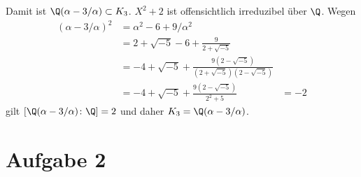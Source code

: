 \documentclass{article}
\begin{document}
\begin{enumerate}
        Damit ist $\Q(\alpha - 3/\alpha) \subset K_3$. $X^2 + 2$ ist offensichtlich irreduzibel über $\Q$.
        Wegen 
        \begin{align*}
            (\alpha - 3/\alpha)^2 &= \alpha^2 - 6 + 9/\alpha^2\\
            &= 2 + \sqrt{-5} - 6 + \frac{9}{2 + \sqrt{-5}}\\
            &= -4 + \sqrt{-5} + \frac{9(2 - \sqrt{-5})}{(2 + \sqrt{-5})(2 - \sqrt{-5})}\\
            &= -4 + \sqrt{-5} + \frac{9(2 - \sqrt{-5})}{2^2 + 5}
            &= -2
        \end{align*}
        gilt $[\Q(\alpha - 3/\alpha) \colon \Q] = 2$ und daher $K_3 = \Q(\alpha - 3/\alpha)$.
    \end{enumerate}
    \section*{Aufgabe 2}
\end{document}
